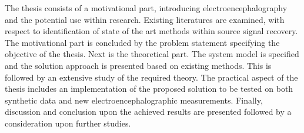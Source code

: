 The thesis consists of a motivational part, introducing electroencephalography and the potential use within research. Existing literatures are examined, with respect to identification of state of the art methods within source signal recovery. The motivational part is concluded by the problem statement specifying the objective of the thesis.
Next is the theoretical part. The system model is specified and the solution approach is presented based on existing methods. This is followed by an extensive study of the required theory. 
The practical aspect of the thesis includes an implementation of the proposed solution to be tested on both synthetic data and new electroencephalographic measurements. 
Finally, discussion and conclusion upon the achieved results are presented followed by a consideration upon further studies. 
